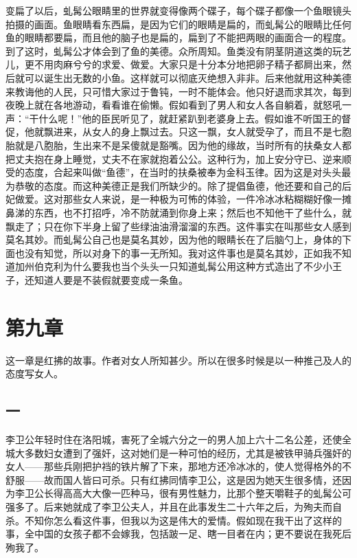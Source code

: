 变扁了以后，虬髯公眼睛里的世界就变得像两个碟子，每个碟子都像一个鱼眼镜头拍摄的画面。鱼眼睛看东西扁，是因为它们的眼睛是扁的，而虬髯公的眼睛比任何鱼的眼睛都要扁，而且他的脑子也是扁的，扁到了不能把两眼的画面合一的程度。到了这时，虬髯公才体会到了鱼的美德。众所周知。鱼类没有阴茎阴道这类的玩艺儿，更不用肉麻兮兮的求爱、做爱。大家只是十分本分地把卵子精子都屙出来，然后就可以诞生出无数的小鱼。这样就可以彻底灭绝想入非非。后来他就用这种美德来教诲他的人民，只可惜大家过于鲁钝，一时不能体会。他只好退而求其次，每到夜晚上就在各地游动，看看谁在偷懒。假如看到了男人和女人各自躺着，就怒吼一声：“干什么呢！”他的臣民听见了，就赶紧趴到老婆身上去。假如谁不听国王的督促，他就飘进来，从女人的身上飘过去。只这一飘，女人就受孕了，而且不是七胞胎就是八胞胎，生出来不是呆傻就是豁嘴。因为他的缘故，当时所有的扶桑女人都把丈夫抱在身上睡觉，丈夫不在家就抱着公公。这种行为，加上安分守已、逆来顺受的态度，合起来叫做“鱼德”，在当时的扶桑被奉为金科玉律。因为这是对头头最为恭敬的态度。而这种美德正是我们所缺少的。除了提倡鱼德，他还要和自己的后妃做爱。这对那些女人来说，是一种极为可怖的体验，一件冷冰冰粘糊糊好像一摊鼻涕的东西，也不打招呼，冷不防就涌到你身上来；然后也不知他干了些什么，就飘走了；只在你下半身上留了些绿油油滑溜溜的东西。这件事实在叫那些女人感到莫名其妙。而虬髯公自己也是莫名其妙，因为他的眼睛长在了后脑勺上，身体的下面也没有知觉，所以对身下的事一无所知。我对这件事也是莫名其妙，正如我不知道加州伯克利为什么要我也当个头头一只知道虬髯公用这种方式造出了不少小王子，还知道人要是不装假就要变成一条鱼。


\section{第九章}

这一章是红拂的故事。作者对女人所知甚少。所以在很多时候是以一种推己及人的态度写女人。 

\subsection{一} 

李卫公年轻时住在洛阳城，害死了全城六分之一的男人加上六十二名公差，还使全城大多数妇女遭到了强奸，这对她们是一种可怕的经历，尤其是被铁甲骑兵强奸的女人——那些兵刚把护裆的铁片解了下来，那地方还冷冰冰的，使人觉得格外的不舒服——故而国人皆曰可杀。只有红拂同情李卫公，这是因为她天生很多情，还因为李卫公长得高高大大像一匹种马，很有男性魅力，比那个整天嚼鞋子的虬髯公可强多了。后来她就成了李卫公夫人，并且在此事发生二十六年之后，为殉夫而自杀。不知你怎么看这件事，但我以为这是伟大的爱情。假如现在我干出了这样的事，全中国的女孩子都不会嫁我，包括跛一足、瞎一目者在内；更不要说在我死后殉我了。 

